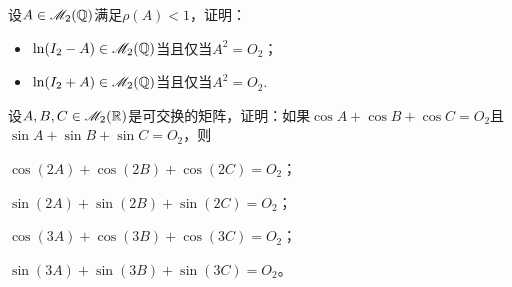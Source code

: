 \begin{mybox}
  \begin{problem}[另一个矩阵分析的瑰宝.]

    设$A\in\mathscr M_2(\mathbb Q)$满足$\rho(A)<1$，证明：
    \begin{itemize}
      \item $\ln(I_2-A)\in\mathscr M_2(\mathbb Q)$当且仅当$A^2=O_2$；
      \item $\ln(I_2+A)\in\mathscr M_2(\mathbb Q)$当且仅当$A^2=O_2$.
    \end{itemize}
  \end{problem}
\end{mybox}

\begin{problem}
  设$A,B,C\in\mathscr M_2(\mathbb R)$是可交换的矩阵，证明：如果$\cos A+\cos B+\cos C=O_2$且$\sin A+\sin B+\sin C=O_2$，则
  \begin{enum}
    \item $\cos(2A)+\cos(2B)+\cos(2C)=O_2$；
    \item $\sin(2A)+\sin(2B)+\sin(2C)=O_2$；
    \item\label{prob4.31c} $\cos(3A)+\cos(3B)+\cos(3C)=O_2$；
    \item\label{prob4.31d} $\sin(3A)+\sin(3B)+\sin(3C)=O_2$。
  \end{enum}
\end{problem}

